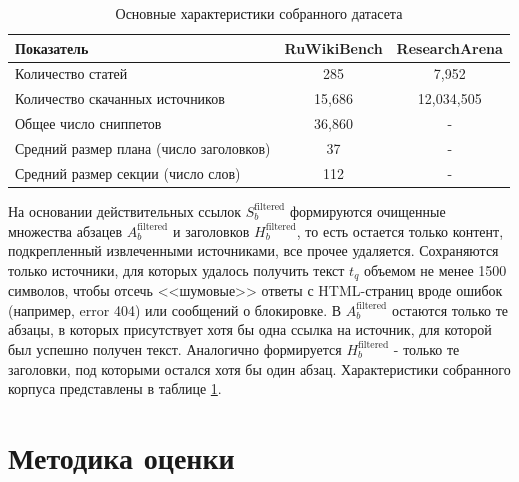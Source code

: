 \documentclass{article}
\begin{document}
\begin{table}[ht!]
  \centering
  \caption{Основные характеристики собранного датасета}
  \label{tab:dataset}
  \begin{tabular}{lcc}
    \hline
    \textbf{Показатель} & \textbf{RuWikiBench} & \textbf{ResearchArena} \\
    \hline
    Количество статей                             & 285 & 7,952\\
    \hline
    Количество скачанных источников               & 15,686 & 12,034,505\\
    \hline
    Общее число сниппетов                         & 36,860 & -\\
    \hline
    Средний размер плана (число заголовков)       & 37 & -\\
    \hline
    Средний размер секции (число слов)            & 112 & -\\
    \hline
  \end{tabular}
\end{table}

На основании действительных ссылок \(S_b^{\mathrm{filtered}}\) формируются очищенные множества абзацев \(A_b^{\mathrm{filtered}}\) и заголовков \(H_b^{\mathrm{filtered}}\), 
то есть остается только контент, подкрепленный извлеченными источниками, все прочее удаляется. 
Сохраняются только источники, для которых удалось получить текст \(t_q\) объемом не менее 1500 символов,
чтобы отсечь <<шумовые>> ответы с HTML-страниц вроде ошибок (например, error 404) или сообщений о блокировке. 
В \(A_b^{\mathrm{filtered}}\) остаются только те абзацы, в которых присутствует хотя бы одна ссылка на источник, для которой был успешно получен текст.
Аналогично формируется \(H_b^{\mathrm{filtered}}\) - только те заголовки, под которыми остался хотя бы один абзац.
Характеристики собранного корпуса представлены в таблице \ref{tab:dataset}.

\section*{Методика оценки}
\end{document}
